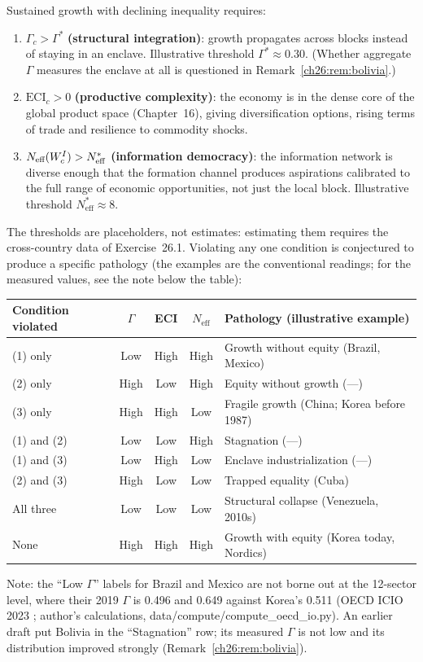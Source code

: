 \documentclass[../structural_economics_book.tex]{subfiles}
\begin{document}
\begin{conjecture}\label{ch26:conj:growth_equity}
Sustained growth with declining inequality requires:
\begin{enumerate}
\item $\Gamma_c > \Gamma^*$ \textbf{(structural integration)}: growth propagates across blocks instead of staying in an enclave. Illustrative threshold $\Gamma^* \approx 0.30$. (Whether aggregate $\Gamma$ measures the enclave at all is questioned in Remark~\ref{ch26:rem:bolivia}.)

\item $\text{ECI}_c > 0$ \textbf{(productive complexity)}: the economy is in the dense core of the global product space (Chapter~16), giving diversification options, rising terms of trade and resilience to commodity shocks.

\item $N_{\text{eff}}(W^I_c) > N^*_{\text{eff}}$ \textbf{(information democracy)}: the information network is diverse enough that the formation channel produces aspirations calibrated to the full range of economic opportunities, not just the local block. Illustrative threshold $N^*_{\text{eff}} \approx 8$.
\end{enumerate}
The thresholds are placeholders, not estimates: estimating them requires the cross-country data of Exercise~26.1. Violating any one condition is conjectured to produce a specific pathology (the examples are the conventional readings; for the measured values, see the note below the table):
\begin{center}
\begin{tabular}{lcccl}
\toprule
Condition violated & $\Gamma$ & ECI & $N_{\text{eff}}$ & Pathology (illustrative example) \\
\midrule
(1) only & Low & High & High & Growth without equity (Brazil, Mexico) \\
(2) only & High & Low & High & Equity without growth (---) \\
(3) only & High & High & Low & Fragile growth (China; Korea before 1987) \\
(1) and (2) & Low & Low & High & Stagnation (---) \\
(1) and (3) & Low & High & Low & Enclave industrialization (---) \\
(2) and (3) & High & Low & Low & Trapped equality (Cuba) \\
All three & Low & Low & Low & Structural collapse (Venezuela, 2010s) \\
None & High & High & High & Growth with equity (Korea today, Nordics) \\
\bottomrule
\end{tabular}
\par\footnotesize Note: the ``Low $\Gamma$'' labels for Brazil and Mexico are not borne out at the 12-sector level, where their 2019 $\Gamma$ is 0.496 and 0.649 against Korea's 0.511 (OECD ICIO 2023 \citep{oecd2023icio}; author's calculations, data/compute/compute\_oecd\_io.py). An earlier draft put Bolivia in the ``Stagnation'' row; its measured $\Gamma$ is not low and its distribution improved strongly (Remark~\ref{ch26:rem:bolivia}).
\end{center}
\end{conjecture}
\end{document}
